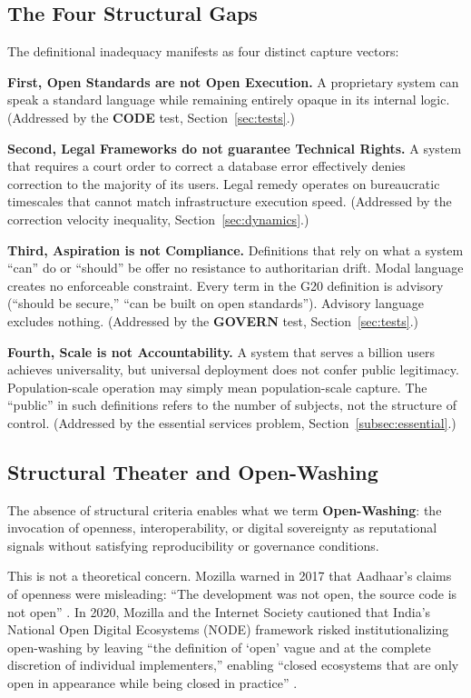 \documentclass{article}
\begin{document}
\subsection{The Four Structural Gaps}

The definitional inadequacy manifests as four distinct capture vectors:

\textbf{First, Open Standards are not Open Execution.} A proprietary system can speak a standard language while remaining entirely opaque in its internal logic. (Addressed by the \textbf{CODE} test, Section~\ref{sec:tests}.)

\textbf{Second, Legal Frameworks do not guarantee Technical Rights.} A system that requires a court order to correct a database error effectively denies correction to the majority of its users. Legal remedy operates on bureaucratic timescales that cannot match infrastructure execution speed. (Addressed by the correction velocity inequality, Section~\ref{sec:dynamics}.)

\textbf{Third, Aspiration is not Compliance.} Definitions that rely on what a system ``can'' do or ``should'' be offer no resistance to authoritarian drift. Modal language creates no enforceable constraint. Every term in the G20 definition is advisory (``should be secure,'' ``can be built on open standards''). Advisory language excludes nothing. (Addressed by the \textbf{GOVERN} test, Section~\ref{sec:tests}.)

\textbf{Fourth, Scale is not Accountability.} A system that serves a billion users achieves universality, but universal deployment does not confer public legitimacy. Population-scale operation may simply mean population-scale capture. The ``public'' in such definitions refers to the number of subjects, not the structure of control. (Addressed by the essential services problem, Section~\ref{subsec:essential}.)

\subsection{Structural Theater and Open-Washing}
\label{subsec:openwashing-intro}

The absence of structural criteria enables what we term \textbf{Open-Washing}: the invocation of openness, interoperability, or digital sovereignty as reputational signals without satisfying reproducibility or governance conditions.

This is not a theoretical concern. Mozilla warned in 2017 that Aadhaar's claims of openness were misleading: ``The development was not open, the source code is not open'' \citep{mozilla2017}. In 2020, Mozilla and the Internet Society cautioned that India's National Open Digital Ecosystems (NODE) framework risked institutionalizing open-washing by leaving ``the definition of `open' vague and at the complete discretion of individual implementers,'' enabling ``closed ecosystems that are only open in appearance while being closed in practice'' \citep{mozilla2020}.
\end{document}
